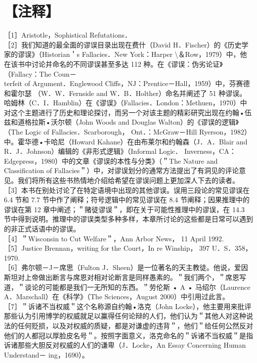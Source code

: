 \section*{【注释】}
［1］Aristotle，Sophistical Refutations．\\
［2］我们知道的最全面的谬误目录出现在费什（David H．Fischer）的《历史学家的谬误》（Historian＇s Fallacies．New York：Harper \textbackslash ＆Row，1979）中，他在该书中讨论并命名的不同谬误甚至多达 112 种。在《谬误：伪劣论证》（Fallacy：The Coun－\\
terfeit of Argument．Englewood Cliffs，NJ：Prentice－Hall，1959）中，芬赛德和霍尔瑟 （W．W．Fernside and W．B．Holther）命名并阐述了 51 种谬误。哈姆林（C．I．Hamblin）在《谬误》（Fallacies．London：Methuen，1970）中对这个主题进行了历史和理论探讨，而另一个对该主题的精彩研究出现在约翰•伍兹和道格拉斯•沃尔顿（John Woods and Douglas Walton）的《谬误的逻辑》（The Logic of Fallacies．Scarborough， Ont．：McGraw－Hill Ryerson，1982）中。霍华德•卡哈尼（Howard Kahane）在由布莱尔和约翰森（J．A．Blair and R．J．Johnson）编辑的《非形式逻辑》（Informal Logic． Inverness，CA：Edgepress，1980）中的文章《谬误的本性与分类》（＂The Nature and Classification of Fallacies＂）中，对谬误划分的通常方法提出了有洞见的评论意见。我们将所有这些书热情地介绍给希望在谬误问题上更加深人下去的读者。\\
［3］本书在别处讨论了在特定语境中出现的其他谬误。误用三段论的常见谬误在 6.4 节和 7.7 节中作了阐释；符号逻辑中的常见谬误在 8.4 节阐释；因果推理中的谬误在第 12 章中阐述；＂赌徒谬误＂，即在关于可能性推理中的谬误，在 14.3 节中得到说明。推理中的谬误类型多种多样，本章所讨论的这些都是日常可以遇到的非正式话语中的谬误。\\
［4］＂Wisconsin to Cut Welfare＂，Ann Arbor News， 11 April 1992.\\
［5］Justice Brennan，writing for the Court，In re Winship， 397 U．S．358， 1970.\\
［6］弗尔顿－J－席思（Fulton J．Sheen）是一位著名的天主教徒。他说，爱因斯坦对上帝做出断言与席恩对相对论断言是同样愚素的。＂我们两个，＂席恩写道，＂谈论的可能都是我们一无所知的东西。＂劳伦斯 • A • 马绍尔（Laurence A．Marschall）在《科学》（The Sciences，August 2000）中引用过此言。\\
［7］＂诉诸不当权威＂这个名称源自约翰•洛克（John Locke），他主要用来批评那些认为引用博学的权威就足以鸁得任何论辩的人们，他们认为＂其他人对这种说法的任何贬损，以及对权威的质疑，都是对谦虚的违背＂，他们＂给任何公然反对他们的人都冠以厚脸皮名号＂。按照字面意义，洛克命名的＂诉诸不当权威＂是指诉诸那些大胆反对权威的人们的谦卑（J．Locke，An Essay Concerning Human Understand－ ing，1690）。\\
